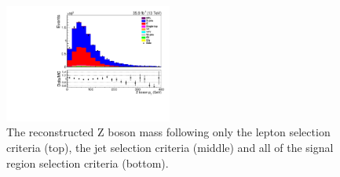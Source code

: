 \begin{figure}[ht]
\includegraphics[width=0.49\textwidth]{figs/background-estimation/plots/unblinded/prompt_mumu_ttbarInc/zPairPt_NPL_mumu_wMass_mumu.pdf}
\caption{
The reconstructed Z boson mass \pT following only the lepton selection criteria (top), the jet selection criteria (middle) and all of the signal region selection criteria (bottom).
}
\label{fig:SR_zBosonPt}
\end{figure}

